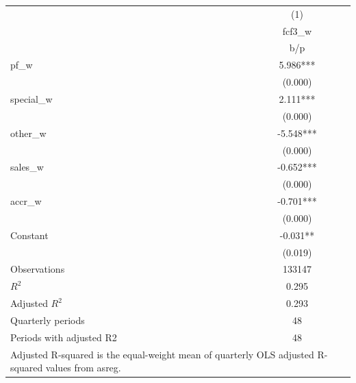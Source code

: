 {
\def\sym#1{\ifmmode^{#1}\else\(^{#1}\)\fi}
\begin{tabular}{l*{1}{c}}
\hline\hline
                    &\multicolumn{1}{c}{(1)}\\
                    &\multicolumn{1}{c}{fcf3\_w}\\
                    &         b/p   \\
\hline
pf\_w                &       5.986***\\
                    &     (0.000)   \\
special\_w           &       2.111***\\
                    &     (0.000)   \\
other\_w             &      -5.548***\\
                    &     (0.000)   \\
sales\_w             &      -0.652***\\
                    &     (0.000)   \\
accr\_w              &      -0.701***\\
                    &     (0.000)   \\
Constant            &      -0.031** \\
                    &     (0.019)   \\
\hline
Observations        &      133147   \\
\(R^{2}\)           &       0.295   \\
Adjusted \(R^{2}\)  &       0.293   \\
Quarterly periods   &          48   \\
Periods with adjusted R2&          48   \\
\hline\hline
\multicolumn{2}{l}{\footnotesize Adjusted R-squared is the equal-weight mean of quarterly OLS adjusted R-squared values from asreg.}\\
\end{tabular}
}

